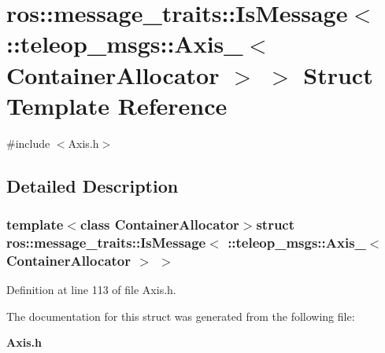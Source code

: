\section{ros::message\_\-traits::IsMessage$<$ ::teleop\_\-msgs::Axis\_\-$<$ ContainerAllocator $>$ $>$ Struct Template Reference}
\label{structros_1_1message__traits_1_1IsMessage_3_01_1_1teleop__msgs_1_1Axis___3_01ContainerAllocator_01_4_01_4}


{\ttfamily \#include $<$Axis.h$>$}



\subsection{Detailed Description}
\subsubsection*{template$<$class ContainerAllocator$>$struct ros::message\_\-traits::IsMessage$<$ ::teleop\_\-msgs::Axis\_\-$<$ ContainerAllocator $>$ $>$}



Definition at line 113 of file Axis.h.



The documentation for this struct was generated from the following file:\begin{DoxyCompactItemize}
\item 
{\bf Axis.h}\end{DoxyCompactItemize}
